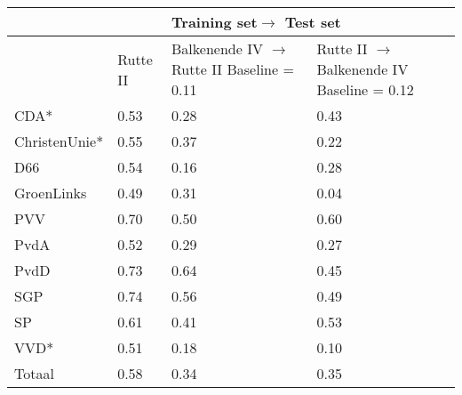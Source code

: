 \begin{tabular}{llll}
\toprule
{}& {}&\multicolumn{2}{l}{Training set$\rightarrow$ Test set}\\
\midrule
{} &Rutte II &\makecell{Balkenende IV $\rightarrow$ Rutte II\\Baseline = 0.11}&  \makecell{Rutte II $\rightarrow$ Balkenende IV\\Baseline = 0.12}  \\
\midrule
CDA*          &0.53&       0.28 &    0.43  \\
ChristenUnie* &0.55&       0.37 &    0.22  \\
D66          &0.54&       0.16 &    0.28  \\
GroenLinks   &0.49&       0.31 &    0.04  \\
PVV          &0.70&       0.50 &    0.60  \\
PvdA         &0.52&       0.29 &    0.27  \\
PvdD         &0.73&       0.64 &    0.45 \\
SGP          &0.74&       0.56 &    0.49  \\
SP           &0.61&       0.41 &    0.53 \\
VVD*          &0.51&       0.18 &    0.10  \\ \hline
Totaal       &0.58&       0.34 &    0.35 \\
\bottomrule
\end{tabular}

